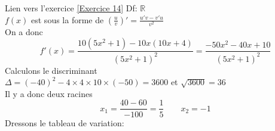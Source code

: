 \documentclass[12pt,fleqn]{report} %
\begin{document}
\begin{correction}Lien vers l'exercice   \ref{Exercice 14}
	Df: $\mathbb{R}$\\ [2mm]
	$f(x)$ est sous la forme de $\left(\frac{u}{v}\right)'=\frac{u'v-v'u}{v^2}$\\ [2mm]
	On a donc
	\[
	f'(x)= \frac{10(5x^2+1)-10x(10x+4)}{(5x^2+1)^2}= \frac{-50x^2-40x+10}{(5x^2+1)^2}
	\]
	Calculons le discriminant\\ [2mm]
	$\Delta=(-40)^2-4\times 4 \times 10 \times(-50)= 3600$ et $\sqrt{3600}= 36$\\ [2mm]
	Il y a donc deux racines \\ [2mm]
	\[
	x_1= \frac{40-60}{-100}= \frac{1}{5} \quad \quad x_2= -1
	\]
	Dressons le tableau de variation: 
	\begin{center}
	\end{center}
\end{correction}
\end{document}
